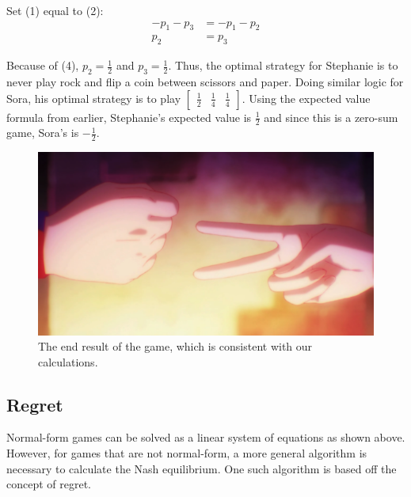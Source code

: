\documentclass[11pt, oneside]{article}
\begin{document}
Set (1) equal to (2):
\begin{align*}
-p_1 - p_3 &= -p_1 - p_2 \\
p_2 &= p_3
\end{align*}

Because of (4), \( p_2 = \frac{1}{2} \) and \( p_3 = \frac{1}{2} \).
Thus, the optimal strategy for Stephanie is to never play rock and flip a coin
between scissors and paper. Doing similar logic for Sora, his optimal strategy
is to play \( \begin{bmatrix} \frac{1}{2} & \frac{1}{4} & \frac{1}{4} \end{bmatrix} \).
Using the expected value formula from earlier, Stephanie's expected value is
\( \frac{1}{2} \) and since this is a zero-sum game, Sora's is \( -\frac{1}{2} \).

\begin{figure}[h!]
  \centering
  \includegraphics[scale=0.2]{result}
  \caption{The end result of the game, which is consistent with our calculations.}
\end{figure}

\subsection{Regret}

Normal-form games can be solved as a linear system of equations as shown above.
However, for games that are not normal-form, a more general algorithm is necessary
to calculate the Nash equilibrium.
One such algorithm is based off the concept of regret.
\end{document}
